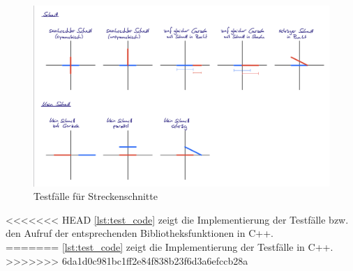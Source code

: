 \documentclass[12pt]{scrartcl}
\begin{document}
\begin{figure}[ht]
    \graphicspath{ {./pictures/} }
    \centering
    \includegraphics[scale=0.2]{Test_Vorlage.jpeg}
    \smallskip
    \caption{Testfälle für Streckenschnitte}
    \label{fig:test_cases}
\end{figure}

<<<<<<< HEAD
\autoref{lst:test_code} zeigt die Implementierung der Testfälle bzw. den Aufruf der entsprechenden Bibliotheksfunktionen in C++.\\
=======
\autoref{lst:test_code} zeigt die Implementierung der Testfälle in C++.\\
>>>>>>> 6da1d0c981bc1ff2e84f838b23f6d3a6efccb28a
\end{document}
